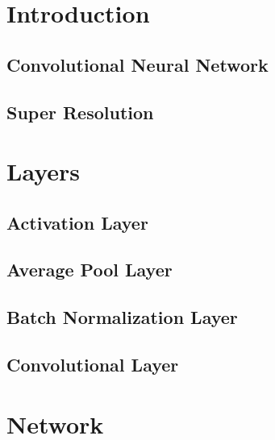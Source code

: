 \documentclass[12pt,a4paper]{report}
\begin{document}
\tableofcontents
\newpage


\chapter{Introduction}

 \section{Convolutional Neural Network}
 \section{Super Resolution}
 
\newpage

\chapter{Layers}


 \section{Activation Layer}
 

 \section{Average Pool Layer} 
 
 
 \section{Batch Normalization Layer}
 
 \section{Convolutional Layer}
 
 
\chapter{Network}
\end{document}

